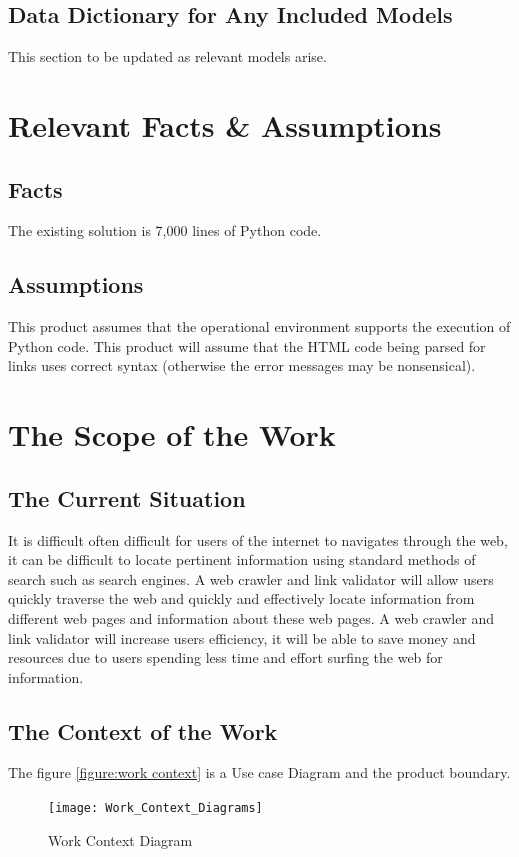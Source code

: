 \documentclass[titlepage]{article}
\begin{document}
\subsection*{Data Dictionary for Any Included Models}
This section to be updated as relevant models arise.

\section{Relevant Facts \& Assumptions}

\subsection*{Facts}
The existing solution is 7,000 lines of Python code.

\subsection*{Assumptions}
This product assumes that the operational environment supports the execution of Python code.
This product will assume that the HTML code being parsed for links uses correct syntax (otherwise the error messages may be nonsensical).

\section{The Scope of the Work }

\subsection*{The Current Situation}

It is difficult often difficult for users of the internet to navigates through the web, it can be difficult to locate pertinent information using standard methods of search such as search engines. A web crawler and link validator will allow users quickly traverse the web and quickly and effectively locate information from different web pages and information about these web pages. A web crawler and link validator will increase users efficiency, it will be able to save money and resources due to users spending less time and effort surfing the web for information.\newline

\subsection*{The Context of the Work }
The figure \ref{figure:work context} is a Use case Diagram and the product boundary.
\begin{figure}[h!]
  \caption{Work Context Diagram}
  \centering
    \texttt{[image: Work\_Context\_Diagrams]}
\end{figure}
\label{figure:work context}
\end{document}
